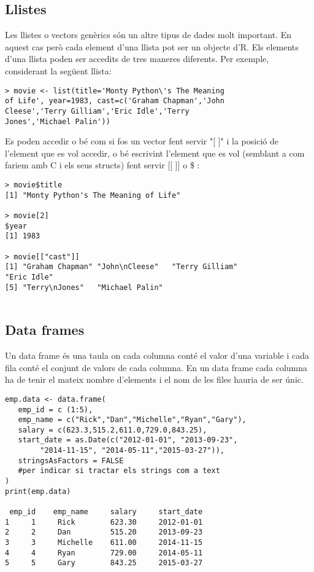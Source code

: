 \documentclass[12pt]{article}
\begin{document}
\subsection{Llistes}
Les llistes o vectors genèrics són un altre tipus de dades molt important. En aquest cas però cada element d'una llista pot ser un objecte d'R. Els elements d'una llista poden ser accedits de tres maneres diferents. 
Per exemple, considerant la següent llista: 
\begin{verbatim}
> movie <- list(title='Monty Python\'s The Meaning
of Life', year=1983, cast=c('Graham Chapman','John
Cleese','Terry Gilliam','Eric Idle','Terry
Jones','Michael Palin'))
\end{verbatim}
Es poden accedir o bé com si fos un vector fent servir "[ ]" i la posició de l'element que es vol accedir, o bé escrivint l'element que es vol (semblant a com fariem amb C i els seus structs) fent servir [[ ]] o \$ :
\begin{verbatim} 
> movie$title
[1] "Monty Python's The Meaning of Life"

> movie[2]
$year
[1] 1983

> movie[["cast"]]
[1] "Graham Chapman" "John\nCleese"   "Terry Gilliam"  
"Eric Idle"     
[5] "Terry\nJones"   "Michael Palin" 


\end{verbatim}
\subsection{Data frames}
Un data frame  és una taula on cada columna conté el valor d'una variable i cada fila conté el conjunt de valors de cada columna. 
En un data frame cada columna ha de tenir el mateix nombre d'elements i el nom de les files hauria de ser únic.

\begin{center}
\begin{verbatim}
emp.data <- data.frame(
   emp_id = c (1:5), 
   emp_name = c("Rick","Dan","Michelle","Ryan","Gary"),
   salary = c(623.3,515.2,611.0,729.0,843.25), 
   start_date = as.Date(c("2012-01-01", "2013-09-23", 
   		"2014-11-15", "2014-05-11","2015-03-27")),
   stringsAsFactors = FALSE 
   #per indicar si tractar els strings com a text 
)	
print(emp.data) 

 emp_id    emp_name     salary     start_date
1     1     Rick        623.30     2012-01-01
2     2     Dan         515.20     2013-09-23
3     3     Michelle    611.00     2014-11-15
4     4     Ryan        729.00     2014-05-11
5     5     Gary        843.25     2015-03-27
\end{verbatim}
\end{center}
\end{document}
